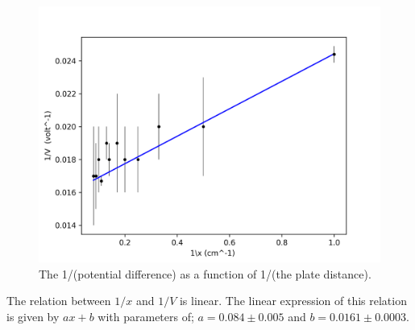\begin{figure}[H]
    \centering
    \includegraphics[width=\textwidth]{capacitors/img/Capacitor_1distance_vs_1V_graph.png}
    \caption{The 1/(potential difference) as a function of 1/(the plate distance).}
    \label{fig:results:exp3.2}
\end{figure}

The relation between $1/x$ and $1/V$ is linear. The linear expression of this relation is given by $ax+b$ with parameters of; $a= 0.084 \pm 0.005$ and $b= 0.0161 \pm 0.0003 $. 
